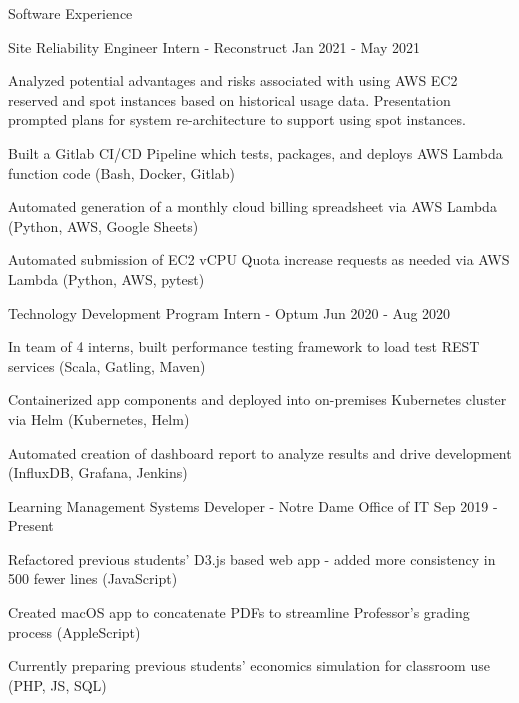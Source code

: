 \documentclass[10pt]{resume} %
\begin{document}
\begin{rSection}{ Software Experience }

\begin{rSubsection}{ Site Reliability Engineer Intern - Reconstruct }{ Jan 2021 - May 2021 }{}{}
\item Analyzed potential advantages and risks associated with using AWS EC2 reserved and spot instances based on historical usage data. Presentation prompted plans for system re-architecture to support using spot instances.
\item Built a Gitlab CI/CD Pipeline which tests, packages, and deploys AWS Lambda function code (Bash, Docker, Gitlab)
\item Automated generation of a monthly cloud billing spreadsheet via AWS Lambda (Python, AWS, Google Sheets)
\item Automated submission of EC2 vCPU Quota increase requests as needed via AWS Lambda (Python, AWS, pytest)
\end{rSubsection}

\begin{rSubsection}{ Technology Development Program Intern - Optum }{ Jun 2020 - Aug 2020 }{}{}
\item In team of 4 interns, built performance testing framework to load test REST services (Scala, Gatling, Maven)
\item Containerized app components and deployed into on-premises Kubernetes cluster via Helm (Kubernetes, Helm)
\item Automated creation of dashboard report to analyze results and drive development (InfluxDB, Grafana, Jenkins)
\end{rSubsection}

\begin{rSubsection}{ Learning Management Systems Developer - Notre Dame Office of IT }{ Sep 2019 - Present }{}{}
\item Refactored previous students' D3.js based web app - added more consistency in 500 fewer lines (JavaScript)
\item Created macOS app to concatenate PDFs to streamline Professor's grading process (AppleScript)
\item Currently preparing previous students' economics simulation for classroom use (PHP, JS, SQL)
\end{rSubsection}


\end{rSection}
\end{document}
